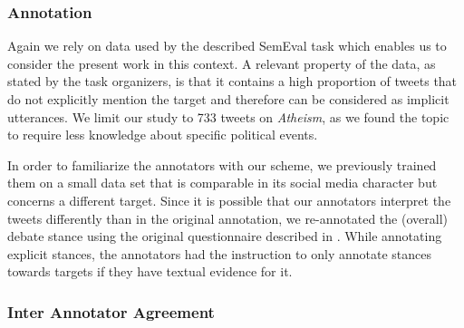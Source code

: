 \documentclass[11pt]{article}
\begin{document}
\subsubsection{Annotation}
Again we rely on data used by the described SemEval task which enables us to consider the present work in this context.
A relevant property of the data, as stated by the task organizers, is that it contains a high proportion of tweets that do not explicitly mention the target and therefore can be considered as implicit utterances.
We limit our study to 733 tweets on \textit{Atheism}, as we found the topic to require less knowledge about specific political events.

In order to familiarize the annotators with our scheme, we previously trained them on a small data set that is comparable in its social media character but concerns a different target.  
Since it is possible that our annotators interpret the tweets differently than in the original annotation, we re-annotated the (overall) debate stance using the original questionnaire described in .
While annotating explicit stances, the annotators had the instruction to only annotate stances towards targets if they have textual evidence for it.

\subsubsection{Inter Annotator Agreement}
\end{document}
